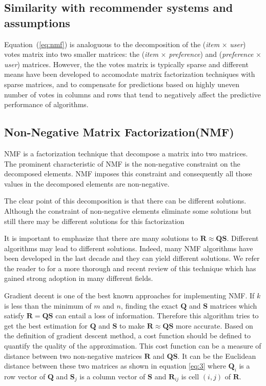 \subsection{Similarity with recommender systems and assumptions}

Equation~(\ref{eq:nmf}) is analoguous to the decomposition of the (\textit{item} $\times$ \textit{user}) votes matrix into two smaller matrices: the (\textit{item} $\times$ \textit{preference}) and (\textit{preference} $\times$ \textit{user}) matrices.  However, the the votes matrix is typically sparse and different means have been developed to accomodate matrix factorization techniques with sparse matrices, and to compensate for predictions based on highly uneven number of votes in columns and rows that tend to negatively affect the predictive performance of algorithms.



\subsection{Non-Negative Matrix Factorization(\ac{NMF})}

\ac{NMF} is a factorization technique that decompose a matrix into two matrices. The prominent characteristic of \ac{NMF} is the non-negative constraint on the decomposed elements. \ac{NMF} imposes this constraint and consequently all those values in the decomposed elements are non-negative.

The clear point of this decomposition is that there can be different solutions. Although the constraint of non-negative elements eliminate some solutions but still there may be different solutions for this factorization

It is important to emphasize that there are many solutions to $\mathbf{R}\approx\mathbf{Q}\mathbf{S}$. Different algorithms may lead to different solutions. Indeed, many \ac{NMF} algorithms have been developed in the last decade and they can yield different solutions. We refer the reader to \citep{Berry2007} for a more thorough and recent review of this technique which has gained strong adoption in many different fields. 

Gradient decent is one of the best known approaches for implementing  \ac{NMF}.  If $k$ is less than the minimum of $m$ and $n$, finding the exact $\mathbf{Q}$ and $\mathbf{S}$ matrices which satisfy $\mathbf{R}=\mathbf{Q}\mathbf{S}$ can entail a loss of information. Therefore this algorithm tries to get the best estimation for $\mathbf{Q}$ and $\mathbf{S}$ to make $\mathbf{R}\approx\mathbf{Q}\mathbf{S}$ more accurate. Based on the definition of gradient descent method, a cost function should be defined to quantify the quality of the approximation. This cost function can be a measure of distance between two non-negative matrices $\mathbf{R}$ and $\mathbf{Q}\mathbf{S}$. It  can be the Euclidean distance between these two matrices as shown in equation \eqref{eq:3} where $\mathbf{Q}_{i}$ is a row vector of $\mathbf{Q}$ and $\mathbf{S}_{j}$ is a column vector of $\mathbf{S}$ and $\mathbf{R}_{ij}$ is cell $(i,j)$ of $\mathbf{R}$.

